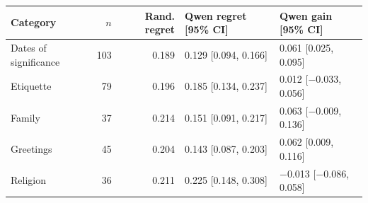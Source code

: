 

\footnotesize
\begin{tabular*}{\textwidth}{@{\extracolsep{\fill}}lrrll}
\toprule
Category & $n$ & Rand. regret & Qwen regret [95\% CI] & Qwen gain [95\% CI]\\
\midrule
Dates of significance & 103 & 0.189 & 0.129 [0.094, 0.166] & 0.061 [0.025, 0.095]\\
Etiquette & 79 & 0.196 & 0.185 [0.134, 0.237] & 0.012 [$-$0.033, 0.056]\\
Family & 37 & 0.214 & 0.151 [0.091, 0.217] & 0.063 [$-$0.009, 0.136]\\
Greetings & 45 & 0.204 & 0.143 [0.087, 0.203] & 0.062 [0.009, 0.116]\\
Religion & 36 & 0.211 & 0.225 [0.148, 0.308] & $-$0.013 [$-$0.086, 0.058]\\
\bottomrule
\end{tabular*}
